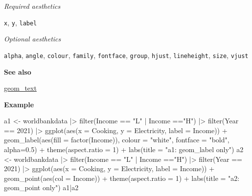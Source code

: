 \documentclass[
  letterpaper,
  DIV=11,
  numbers=noendperiod]{scrreprt}
\newenvironment{Shaded}{\begin{snugshade}}{\end{snugshade}}
\newcommand{\AttributeTok}[1]{\textcolor[rgb]{0.40,0.45,0.13}{#1}}
\newcommand{\DecValTok}[1]{\textcolor[rgb]{0.68,0.00,0.00}{#1}}
\newcommand{\FloatTok}[1]{\textcolor[rgb]{0.68,0.00,0.00}{#1}}
\newcommand{\FunctionTok}[1]{\textcolor[rgb]{0.28,0.35,0.67}{#1}}
\newcommand{\NormalTok}[1]{\textcolor[rgb]{0.00,0.23,0.31}{#1}}
\newcommand{\OtherTok}[1]{\textcolor[rgb]{0.00,0.23,0.31}{#1}}
\newcommand{\SpecialCharTok}[1]{\textcolor[rgb]{0.37,0.37,0.37}{#1}}
\newcommand{\StringTok}[1]{\textcolor[rgb]{0.13,0.47,0.30}{#1}}
\begin{document}
\emph{Required aesthetics}

\texttt{x}, \texttt{y}, \texttt{label}

\emph{Optional aesthetics}

\texttt{alpha}, \texttt{angle}, \texttt{colour}, \texttt{family},
\texttt{fontface}, \texttt{group}, \texttt{hjust}, \texttt{lineheight},
\texttt{size}, \texttt{vjust}

\textbf{See also}

\hyperref[text]{geom\_text}

\textbf{Example}

\begin{Shaded}
\begin{Highlighting}[]
\NormalTok{a1 }\OtherTok{\textless{}{-}}\NormalTok{ worldbankdata }\SpecialCharTok{|\textgreater{}}
  \FunctionTok{filter}\NormalTok{(Income }\SpecialCharTok{==} \StringTok{"L"} \SpecialCharTok{|}\NormalTok{ Income }\SpecialCharTok{==}\StringTok{"H"}\NormalTok{) }\SpecialCharTok{|\textgreater{}} 
  \FunctionTok{filter}\NormalTok{(Year }\SpecialCharTok{==} \DecValTok{2021}\NormalTok{) }\SpecialCharTok{|\textgreater{}}
  \FunctionTok{ggplot}\NormalTok{(}\FunctionTok{aes}\NormalTok{(}\AttributeTok{x =}\NormalTok{ Cooking, }\AttributeTok{y =}\NormalTok{ Electricity, }\AttributeTok{label =}\NormalTok{ Income)) }\SpecialCharTok{+} 
  \FunctionTok{geom\_label}\NormalTok{(}\FunctionTok{aes}\NormalTok{(}\AttributeTok{fill =} \FunctionTok{factor}\NormalTok{(Income)), }\AttributeTok{colour =} \StringTok{"white"}\NormalTok{, }\AttributeTok{fontface =} \StringTok{"bold"}\NormalTok{, }\AttributeTok{alpha=}\FloatTok{0.5}\NormalTok{) }\SpecialCharTok{+} \FunctionTok{theme}\NormalTok{(}\AttributeTok{aspect.ratio =} \DecValTok{1}\NormalTok{) }\SpecialCharTok{+} \FunctionTok{labs}\NormalTok{(}\AttributeTok{title =} \StringTok{"a1: geom\_label only"}\NormalTok{) }
\NormalTok{a2 }\OtherTok{\textless{}{-}}\NormalTok{ worldbankdata }\SpecialCharTok{|\textgreater{}}
  \FunctionTok{filter}\NormalTok{(Income }\SpecialCharTok{==} \StringTok{"L"} \SpecialCharTok{|}\NormalTok{ Income }\SpecialCharTok{==}\StringTok{"H"}\NormalTok{) }\SpecialCharTok{|\textgreater{}} 
  \FunctionTok{filter}\NormalTok{(Year }\SpecialCharTok{==} \DecValTok{2021}\NormalTok{) }\SpecialCharTok{|\textgreater{}}
  \FunctionTok{ggplot}\NormalTok{(}\FunctionTok{aes}\NormalTok{(}\AttributeTok{x =}\NormalTok{ Cooking, }\AttributeTok{y =}\NormalTok{ Electricity, }\AttributeTok{label =}\NormalTok{ Income)) }\SpecialCharTok{+} 
  \FunctionTok{geom\_point}\NormalTok{(}\FunctionTok{aes}\NormalTok{(}\AttributeTok{col =}\NormalTok{ Income)) }\SpecialCharTok{+}  \FunctionTok{theme}\NormalTok{(}\AttributeTok{aspect.ratio =} \DecValTok{1}\NormalTok{) }\SpecialCharTok{+} 
  \FunctionTok{labs}\NormalTok{(}\AttributeTok{title =} \StringTok{"a2: geom\_point only"}\NormalTok{) }
\NormalTok{a1}\SpecialCharTok{|}\NormalTok{a2}
\end{Highlighting}
\end{Shaded}
\end{document}
